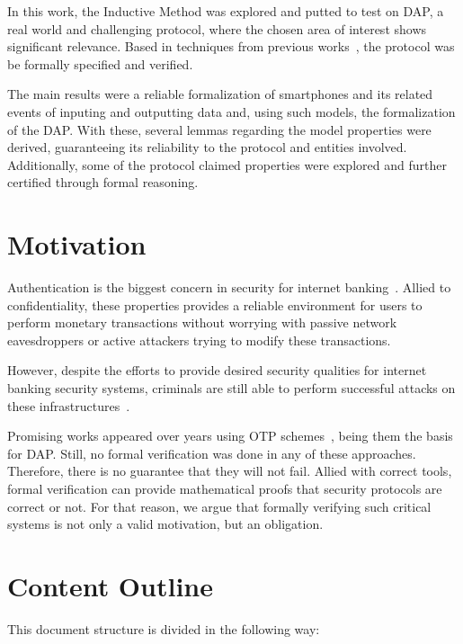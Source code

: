 In this work, the Inductive Method was explored and putted to test on DAP, a real world and challenging protocol, where the chosen area of interest shows significant relevance. Based in techniques from previous works~\cite{BellaPaulson2006, Paulson99, Paulson98}, the protocol was be formally specified and verified.

The main results were a reliable formalization of smartphones and its related events of inputing and outputting data and, using such models, the formalization of the DAP. With these, several lemmas regarding the model properties were derived, guaranteeing its reliability to the protocol and entities involved. Additionally, some of the protocol claimed properties were explored and further certified through formal reasoning.




\section{Motivation}
Authentication is the biggest concern in security for internet banking~\cite{Hutchinson2003}. Allied to confidentiality, these properties provides a reliable environment for users to perform monetary transactions without worrying with passive network eavesdroppers or active attackers trying to modify these transactions.

However, despite the efforts to provide desired security qualities for internet banking security systems, criminals are still able to perform successful attacks on these infrastructures~\cite{Adham2013}.

Promising works appeared over years using OTP schemes~\cite{Starnberger2009, LeeHyunLim2010}, being them the basis for DAP\@. Still, no formal verification was done in any of these approaches. Therefore, there is no guarantee that they will not fail. Allied with correct tools, formal verification can provide mathematical proofs that security protocols are correct or not. For that reason, we argue that formally verifying such critical systems is not only a valid motivation, but an obligation.



\section{Content Outline}

This document structure is divided in the following way:


